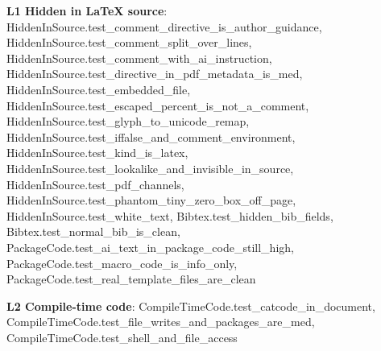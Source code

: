 \documentclass[10pt,a4paper]{article}
\begin{document}
\textbf{L1 Hidden in LaTeX source}: \textcolor{ok}{HiddenInSource.\allowbreak{}test\_\allowbreak{}comment\_\allowbreak{}directive\_\allowbreak{}is\_\allowbreak{}author\_\allowbreak{}guidance}, \textcolor{ok}{HiddenInSource.\allowbreak{}test\_\allowbreak{}comment\_\allowbreak{}split\_\allowbreak{}over\_\allowbreak{}lines}, \textcolor{ok}{HiddenInSource.\allowbreak{}test\_\allowbreak{}comment\_\allowbreak{}with\_\allowbreak{}ai\_\allowbreak{}instruction}, \textcolor{ok}{HiddenInSource.\allowbreak{}test\_\allowbreak{}directive\_\allowbreak{}in\_\allowbreak{}pdf\_\allowbreak{}metadata\_\allowbreak{}is\_\allowbreak{}med}, \textcolor{ok}{HiddenInSource.\allowbreak{}test\_\allowbreak{}embedded\_\allowbreak{}file}, \textcolor{ok}{HiddenInSource.\allowbreak{}test\_\allowbreak{}escaped\_\allowbreak{}percent\_\allowbreak{}is\_\allowbreak{}not\_\allowbreak{}a\_\allowbreak{}comment}, \textcolor{ok}{HiddenInSource.\allowbreak{}test\_\allowbreak{}glyph\_\allowbreak{}to\_\allowbreak{}unicode\_\allowbreak{}remap}, \textcolor{ok}{HiddenInSource.\allowbreak{}test\_\allowbreak{}iffalse\_\allowbreak{}and\_\allowbreak{}comment\_\allowbreak{}environment}, \textcolor{ok}{HiddenInSource.\allowbreak{}test\_\allowbreak{}kind\_\allowbreak{}is\_\allowbreak{}latex}, \textcolor{ok}{HiddenInSource.\allowbreak{}test\_\allowbreak{}lookalike\_\allowbreak{}and\_\allowbreak{}invisible\_\allowbreak{}in\_\allowbreak{}source}, \textcolor{ok}{HiddenInSource.\allowbreak{}test\_\allowbreak{}pdf\_\allowbreak{}channels}, \textcolor{ok}{HiddenInSource.\allowbreak{}test\_\allowbreak{}phantom\_\allowbreak{}tiny\_\allowbreak{}zero\_\allowbreak{}box\_\allowbreak{}off\_\allowbreak{}page}, \textcolor{ok}{HiddenInSource.\allowbreak{}test\_\allowbreak{}white\_\allowbreak{}text}, \textcolor{ok}{Bibtex.\allowbreak{}test\_\allowbreak{}hidden\_\allowbreak{}bib\_\allowbreak{}fields}, \textcolor{ok}{Bibtex.\allowbreak{}test\_\allowbreak{}normal\_\allowbreak{}bib\_\allowbreak{}is\_\allowbreak{}clean}, \textcolor{ok}{PackageCode.\allowbreak{}test\_\allowbreak{}ai\_\allowbreak{}text\_\allowbreak{}in\_\allowbreak{}package\_\allowbreak{}code\_\allowbreak{}still\_\allowbreak{}high}, \textcolor{ok}{PackageCode.\allowbreak{}test\_\allowbreak{}macro\_\allowbreak{}code\_\allowbreak{}is\_\allowbreak{}info\_\allowbreak{}only}, \textcolor{bad}{PackageCode.\allowbreak{}test\_\allowbreak{}real\_\allowbreak{}template\_\allowbreak{}files\_\allowbreak{}are\_\allowbreak{}clean}\par
\textbf{L2 Compile-time code}: \textcolor{ok}{CompileTimeCode.\allowbreak{}test\_\allowbreak{}catcode\_\allowbreak{}in\_\allowbreak{}document}, \textcolor{ok}{CompileTimeCode.\allowbreak{}test\_\allowbreak{}file\_\allowbreak{}writes\_\allowbreak{}and\_\allowbreak{}packages\_\allowbreak{}are\_\allowbreak{}med}, \textcolor{ok}{CompileTimeCode.\allowbreak{}test\_\allowbreak{}shell\_\allowbreak{}and\_\allowbreak{}file\_\allowbreak{}access}\par
\end{document}
